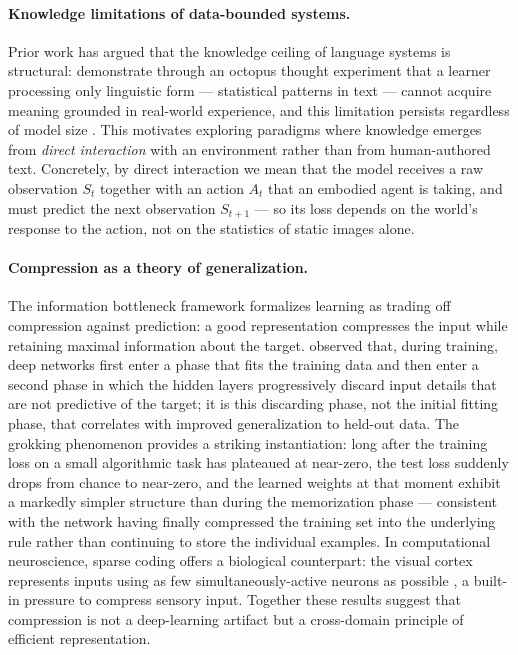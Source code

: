 \documentclass[letterpaper]{article} %
\begin{document}
\paragraph{Knowledge limitations of data-bounded systems.}
Prior work has argued that the knowledge ceiling of language systems is structural: \citet{bender2020climbing} demonstrate through an octopus thought experiment that a learner processing only linguistic form --- statistical patterns in text --- cannot acquire meaning grounded in real-world experience, and this limitation persists regardless of model size \citep{bender2021stochastic}. This motivates exploring paradigms where knowledge emerges from \emph{direct interaction} with an environment rather than from human-authored text. Concretely, by direct interaction we mean that the model receives a raw observation $S_t$ together with an action $A_t$ that an embodied agent is taking, and must predict the next observation $S_{t+1}$ --- so its loss depends on the world's response to the action, not on the statistics of static images alone.

\paragraph{Compression as a theory of generalization.}
The information bottleneck framework \citep{tishby1999information} formalizes learning as trading off compression against prediction: a good representation compresses the input while retaining maximal information about the target. \citet{shwartz2017opening} observed that, during training, deep networks first enter a phase that fits the training data and then enter a second phase in which the hidden layers progressively discard input details that are not predictive of the target; it is this discarding phase, not the initial fitting phase, that correlates with improved generalization to held-out data. The grokking phenomenon \citep{power2022grokking} provides a striking instantiation: long after the training loss on a small algorithmic task has plateaued at near-zero, the test loss suddenly drops from chance to near-zero, and the learned weights at that moment exhibit a markedly simpler structure than during the memorization phase --- consistent with the network having finally compressed the training set into the underlying rule rather than continuing to store the individual examples. In computational neuroscience, sparse coding offers a biological counterpart: the visual cortex represents inputs using as few simultaneously-active neurons as possible \citep{olshausen2004sparse}, a built-in pressure to compress sensory input. Together these results suggest that compression is not a deep-learning artifact but a cross-domain principle of efficient representation.
\end{document}
